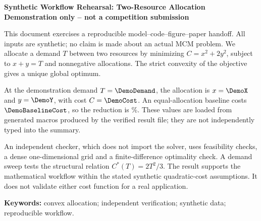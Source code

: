 \begin{center}
\textbf{Synthetic Workflow Rehearsal: Two-Resource Allocation}\\[0.5em]
\textbf{Demonstration only -- not a competition submission}
\end{center}
This document exercises a reproducible model--code--figure--paper handoff.
All inputs are synthetic; no claim is made about an actual MCM problem.
We allocate a demand $T$ between two resources by minimizing
$C=x^2+2y^2$, subject to $x+y=T$ and nonnegative allocations.
The strict convexity of the objective gives a unique global optimum.

At the demonstration demand $T=\DemoDemand$, the allocation is
$x=\DemoX$ and $y=\DemoY$, with cost $C=\DemoCost$.
An equal-allocation baseline costs $\DemoBaselineCost$, so the reduction is
\DemoSavingPct\%.
These values are loaded from generated macros produced by the verified result
file; they are not independently typed into the summary.

An independent checker, which does not import the solver, uses feasibility
checks, a dense one-dimensional grid and a finite-difference optimality check.
A demand sweep tests the structural relation $C^*(T)=2T^2/3$.
The result supports the mathematical workflow within the stated synthetic
quadratic-cost assumptions. It does not validate either cost function for a
real application.

\noindent\textbf{Keywords:} convex allocation; independent verification;
synthetic data; reproducible workflow.
